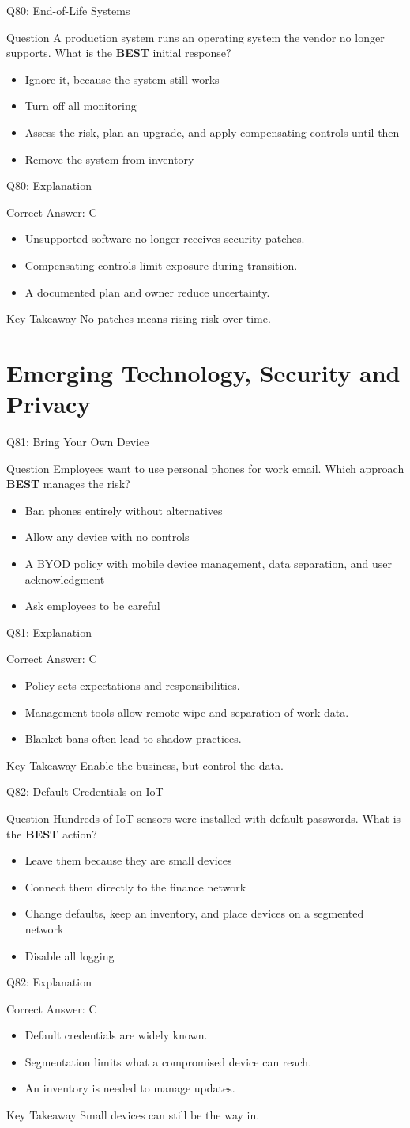 \documentclass[aspectratio=169]{beamer}
\newcommand{\hq}[7]{%
	\begin{frame}{Q#1: #2}
		\begin{block}{Question}
			#3
		\end{block}
		\begin{itemize}
			#4
		\end{itemize}
	\end{frame}
	\begin{frame}{Q#1: Explanation}
		\begin{block}{Correct Answer: #5}
			\begin{itemize}
				#6
			\end{itemize}
		\end{block}
		\begin{alertblock}{Key Takeaway}
			#7
		\end{alertblock}
	\end{frame}
}
\begin{document}
	\hq{80}{End-of-Life Systems}
	{A production system runs an operating system the vendor no longer supports. What is the \textbf{BEST} initial response?}
	{\item[\textbf{(A)}] Ignore it, because the system still works
		\item[\textbf{(B)}] Turn off all monitoring
		\item[\textbf{(C)}] Assess the risk, plan an upgrade, and apply compensating controls until then
		\item[\textbf{(D)}] Remove the system from inventory}
	{C}
	{\item Unsupported software no longer receives security patches.
		\item Compensating controls limit exposure during transition.
		\item A documented plan and owner reduce uncertainty.}
	{No patches means rising risk over time.}
	
	\section{Emerging Technology, Security and Privacy}
	
	\hq{81}{Bring Your Own Device}
	{Employees want to use personal phones for work email. Which approach \textbf{BEST} manages the risk?}
	{\item[\textbf{(A)}] Ban phones entirely without alternatives
		\item[\textbf{(B)}] Allow any device with no controls
		\item[\textbf{(C)}] A BYOD policy with mobile device management, data separation, and user acknowledgment
		\item[\textbf{(D)}] Ask employees to be careful}
	{C}
	{\item Policy sets expectations and responsibilities.
		\item Management tools allow remote wipe and separation of work data.
		\item Blanket bans often lead to shadow practices.}
	{Enable the business, but control the data.}
	
	\hq{82}{Default Credentials on IoT}
	{Hundreds of IoT sensors were installed with default passwords. What is the \textbf{BEST} action?}
	{\item[\textbf{(A)}] Leave them because they are small devices
		\item[\textbf{(B)}] Connect them directly to the finance network
		\item[\textbf{(C)}] Change defaults, keep an inventory, and place devices on a segmented network
		\item[\textbf{(D)}] Disable all logging}
	{C}
	{\item Default credentials are widely known.
		\item Segmentation limits what a compromised device can reach.
		\item An inventory is needed to manage updates.}
	{Small devices can still be the way in.}
	
\end{document}
